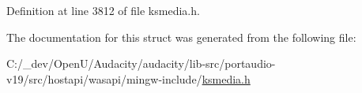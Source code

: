 Definition at line 3812 of file ksmedia.\+h.



The documentation for this struct was generated from the following file\+:\begin{DoxyCompactItemize}
\item 
C\+:/\+\_\+dev/\+Open\+U/\+Audacity/audacity/lib-\/src/portaudio-\/v19/src/hostapi/wasapi/mingw-\/include/\hyperlink{ksmedia_8h}{ksmedia.\+h}\end{DoxyCompactItemize}
